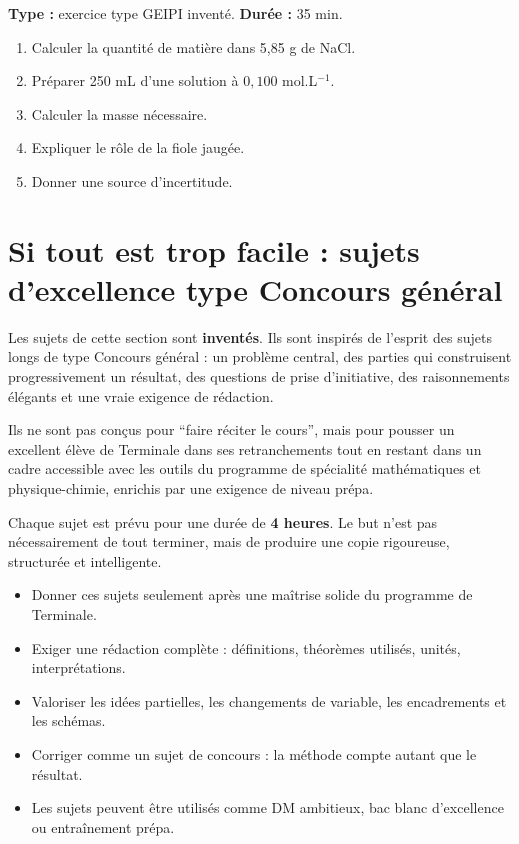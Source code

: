 \documentclass[11pt,a4paper]{article}
\begin{document}
\hypertarget{PC-GEIPI-02}{}
\begin{geipi}
\textbf{Type :} exercice type GEIPI inventé.  
\textbf{Durée :} 35 min.
\begin{enumerate}
  \item Calculer la quantité de matière dans 5,85 g de NaCl.
  \item Préparer 250 mL d'une solution à $0{,}100$ mol.L$^{-1}$.
  \item Calculer la masse nécessaire.
  \item Expliquer le rôle de la fiole jaugée.
  \item Donner une source d'incertitude.
\end{enumerate}
\end{geipi}

\section{Si tout est trop facile : sujets d'excellence type Concours général}

\begin{alerte}
Les sujets de cette section sont \textbf{inventés}. Ils sont inspirés de l'esprit des sujets longs de type Concours général : un problème central, des parties qui construisent progressivement un résultat, des questions de prise d'initiative, des raisonnements élégants et une vraie exigence de rédaction. 

Ils ne sont pas conçus pour ``faire réciter le cours'', mais pour pousser un excellent élève de Terminale dans ses retranchements tout en restant dans un cadre accessible avec les outils du programme de spécialité mathématiques et physique-chimie, enrichis par une exigence de niveau prépa.

Chaque sujet est prévu pour une durée de \textbf{4 heures}. Le but n'est pas nécessairement de tout terminer, mais de produire une copie rigoureuse, structurée et intelligente.
\end{alerte}

\begin{methode}
\begin{itemize}
  \item Donner ces sujets seulement après une maîtrise solide du programme de Terminale.
  \item Exiger une rédaction complète : définitions, théorèmes utilisés, unités, interprétations.
  \item Valoriser les idées partielles, les changements de variable, les encadrements et les schémas.
  \item Corriger comme un sujet de concours : la méthode compte autant que le résultat.
  \item Les sujets peuvent être utilisés comme DM ambitieux, bac blanc d'excellence ou entraînement prépa.
\end{itemize}
\end{methode}
\end{document}
